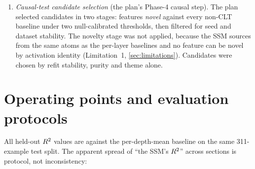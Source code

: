 \begin{enumerate}
    protocol after release). The protocol specified four baselines.
    (A)~A per-layer SAE with its implied update
    $\hat v_{\ell+1} - \hat v_\ell$: run; it is the $-0.223$ of
    \cref{sec:evaluation:baselines}, which \cref{fig:pareto} labels
    ``Baseline~B''. What that figure labels ``Baseline~A'', the per-layer
    dictionary trained directly on $\Dl$, is the comparator we used at
    Gate~3 and a stronger baseline than the plan's. (B)~A crosscoder or
    shared-dictionary
    MLSAE, to be replicated on the same activations where no public weights
    could be used: \emph{not run}. Neither was fit or evaluated (training a
    full-width crosscoder exceeds the study GPU); our MLSAE-derived baseline
    uses that release's independent single-layer SAEs
    (\cref{sec:decomposition:sources}), not a shared dictionary. (C)~The
    Tuned Lens, as its per-layer divergence from the final-layer output
    distribution: we report its implied-update $\Rsq$ instead, the statistic
    the Gate-1 baseline already used. (D)~A CLT in two variants, native
    MLP-write and residual-write, from public weights or a scoped-down
    replication of the published recipe: only the residual-write variant was
    fit, as free decoders over frozen shared sources and not as a natively
    trained CLT (\cref{sec:evaluation:clt}). For the native variant we took
    the plan's fallback and record it as a limitation
    (\cref{sec:limitations}).
  \item \emph{Causal-test candidate selection} (the plan's Phase-4 causal
    step). The plan selected candidates in two stages: features \emph{novel}
    against every non-CLT baseline under two null-calibrated thresholds,
    then filtered for seed and dataset stability. The novelty stage was not
    applied, because the SSM sources from the same atoms as the per-layer
    baselines and no feature can be novel by activation identity
    (Limitation~1, \cref{sec:limitations}). Candidates were chosen by refit
    stability, purity and theme alone.
\end{enumerate}

\section{Operating points and evaluation protocols}
\label{app:operating}

All held-out $\Rsq$ values are against the per-depth-mean baseline on the
same 311-example test split. The apparent spread of ``the SSM's $\Rsq$''
across sections is protocol, not inconsistency:

